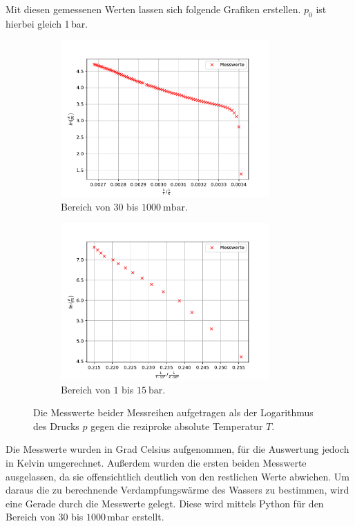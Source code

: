 Mit diesen gemessenen Werten lassen sich folgende Grafiken erstellen. $p_0$ ist hierbei gleich 1\,bar.
\begin{figure}[H]
  \begin{subfigure}{0.48\textwidth}
      \includegraphics[height=6cm]{plota.pdf}  
    \caption{Bereich von $30$ bis $\SI{1000}{\milli\bar}$.}
    \label{fig:MesswerteKlein}
  \end{subfigure}
  \hfill
  \begin{subfigure}{0.48\textwidth}
    \includegraphics[height=6cm]{plotb.pdf}
    \caption{Bereich von $1$ bis $\SI{15}{\bar}$.}
    \label{fig:MesswerteGross}
  \end{subfigure}
  \caption{Die Messwerte beider Messreihen aufgetragen als der Logarithmus des Drucks $p$
  gegen die reziproke absolute Temperatur $T$.}
  \label{fig:Teila}
\end{figure}
\noindent
Die Messwerte wurden in Grad Celsius aufgenommen, für die Auswertung jedoch in Kelvin umgerechnet. Außerdem wurden die ersten beiden Messwerte ausgelassen,
da sie offensichtlich deutlich von den restlichen Werte abwichen.
Um daraus die zu berechnende Verdampfungswärme des Wassers zu bestimmen, wird eine Gerade durch die Messwerte gelegt.
Diese wird mittels Python für den Bereich von $30$ bis $1000$\,mbar erstellt. \\
